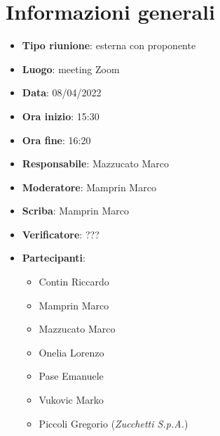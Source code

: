 \section{Informazioni generali}
\begin{itemize}
  \item \textbf{Tipo riunione}: esterna con proponente
  \item \textbf{Luogo}: meeting Zoom
  \item \textbf{Data}: 08/04/2022
  \item \textbf{Ora inizio}: 15:30
  \item \textbf{Ora fine}: 16:20
  \item \textbf{Responsabile}: Mazzucato Marco
  \item \textbf{Moderatore}: Mamprin Marco
  \item \textbf{Scriba}: Mamprin Marco
  \item \textbf{Verificatore}: ???
  \item \textbf{Partecipanti}:
  \begin{itemize}
    \item Contin Riccardo
    \item Mamprin Marco
    \item Mazzucato Marco
    \item Onelia Lorenzo
    \item Pase Emanuele
    \item Vukovic Marko
    \item Piccoli Gregorio (\textit{Zucchetti S.p.A.})
  \end{itemize}
\end{itemize}
